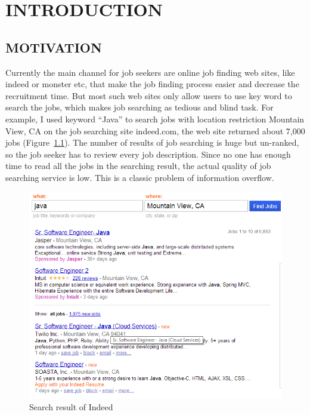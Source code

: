 \chapter{INTRODUCTION}




\section{MOTIVATION}
Currently the main channel for job seekers are online job finding web sites, like indeed or  monster etc, that make the job finding process easier and decrease the recruitment time. But most such web sites only allow users to use key word to search the jobs, which makes job searching as tedious and blind task. For example, I used keyword ``Java'' to search jobs with location restriction Mountain View, CA on the job searching site indeed.com, the web site returned about 7,000 jobs (Figure~\ref{fig:Indeed}). The number of results of job searching is huge but un-ranked, so the job seeker has to review every job description. Since no one has enough time to read all the jobs in the searching result, the actual quality of job searching service is low. This is a classic problem of information overflow.


\begin{figure}[htbp]
  \centering
  \includegraphics[scale=0.4]{images/indeed1.png}
  \caption{Search result of Indeed}
  \label{fig:Indeed}
\end{figure}

